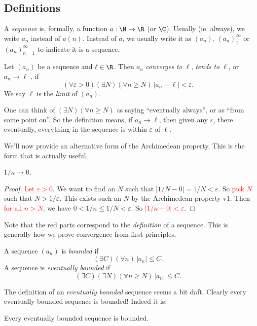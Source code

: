 \documentclass[a4paper]{article}
\begin{document}
\subsection{Definitions}
\begin{defi}[Sequence]
  A \emph{sequence} is, formally, a function $a: \N \to \R$ (or $\C$). Usually (ie. always), we write $a_n$ instead of $a(n)$. Instead of $a$, we usually write it as $(a_n)$, $(a_n)_1^\infty$ or $(a_n)_{n = 1}^\infty$ to indicate it is a sequence.
\end{defi}

\begin{defi}
  Let $(a_n)$ be a sequence and $\ell\in \R$. Then $a_n$ \emph{converges to} $\ell$, \emph{tends to} $\ell$, or $a_n \to \ell$ , if
  \[
    (\forall \varepsilon > 0)(\exists N)(\forall n\geq N)\,|a_n - \ell| < \varepsilon.
  \]
  We say $\ell$ is the \emph{limit} of $(a_n)$.
\end{defi}
One can think of $(\exists N)(\forall n\geq N)$ as saying ``eventually always'', or as ``from some point on''. So the definition means, if $a_n\to \ell$, then given any $\varepsilon$, there eventually, everything in the sequence is within $\varepsilon$ of $\ell$.

We'll now provide an alternative form of the Archimedean property. This is the form that is actually useful.
\begin{lemma}
  $1/n \to 0$.
\end{lemma}

\begin{proof}
  \textcolor{red}{Let $\varepsilon > 0$}. We want to find an $N$ such that $|1/N - 0| = 1/N < \varepsilon$. So \textcolor{red}{pick $N$} such that $N > 1/\varepsilon$. This exists such an $N$ by the Archimedean property v1. Then \textcolor{red}{for all $n > N$}, we have $0 < 1/n \leq 1/N < \varepsilon$. So \textcolor{red}{$|1/n - 0| < \varepsilon$}.
\end{proof}
Note that the red parts correspond to the \emph{definition} of a sequence. This is generally how we prove convergence from first principles.

\begin{defi}
  A sequence $(a_n)$ is \emph{bounded} if
  \[
    (\exists C)(\forall n)\,|a_n| \leq C.
  \]
  A sequence is \emph{eventually bounded} if
  \[
    (\exists C)(\exists N)(\forall n\geq N)\, |a_n| \leq C.
  \]
\end{defi}
The definition of an \emph{eventually bounded} sequence seems a bit daft. Clearly every eventually bounded sequence is bounded! Indeed it is:
\begin{lemma}
  Every eventually bounded sequence is bounded.
\end{lemma}
\end{document}
